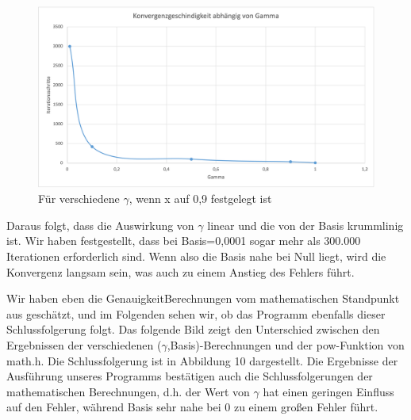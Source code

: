 \documentclass[course=erap]{aspdoc}
\begin{document}
\begin{figure}[h]
\centering
\includegraphics[width=0.9\linewidth]{Bilder/KonvergenzGamma.png}
\caption{Für verschiedene $\gamma$, wenn x auf 0,9 festgelegt ist}
\label{fig:gammachange}
\end{figure}

    
\par
Daraus folgt, dass die Auswirkung von $\gamma$ linear und die von der Basis krummlinig ist. Wir haben festgestellt, dass bei Basis=0,0001 sogar mehr als 300.000 Iterationen erforderlich sind. Wenn also die Basis nahe bei Null liegt, wird die Konvergenz langsam sein, was auch zu einem Anstieg des Fehlers führt.

\par
Wir haben eben die GenauigkeitBerechnungen vom mathematischen Standpunkt aus geschätzt, und im Folgenden sehen wir, ob das Programm ebenfalls dieser Schlussfolgerung folgt. Das folgende Bild zeigt den Unterschied zwischen den Ergebnissen der verschiedenen ($\gamma$,Basis)-Berechnungen und der pow-Funktion von math.h. Die Schlussfolgerung ist in Abbildung 10 dargestellt. Die Ergebnisse der Ausführung unseres Programms bestätigen auch die Schlussfolgerungen der mathematischen Berechnungen, d.h. der Wert von $\gamma$ hat einen geringen Einfluss auf den Fehler, während Basis sehr nahe bei 0 zu einem großen Fehler führt.
\end{document}
